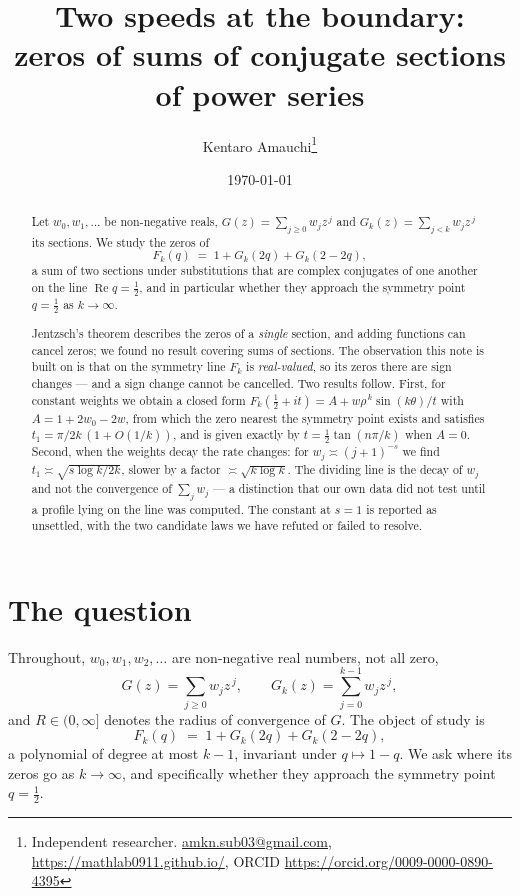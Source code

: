 \documentclass[11pt,a4paper]{article}
\title{Two speeds at the boundary:\\
zeros of sums of conjugate sections of power series}
\author{Kentaro Amauchi\thanks{Independent researcher.
\href{mailto:amkn.sub03@gmail.com}{amkn.sub03@gmail.com},
\url{https://mathlab0911.github.io/}, ORCID \url{https://orcid.org/0009-0000-0890-4395}}}
\date{\today}
\theoremstyle{plain}
\theoremstyle{definition}
\theoremstyle{remark}
\begin{document}
\maketitle

\begin{abstract}
Let $w_0,w_1,\dots$ be non-negative reals, $G(z)=\sum_{j\ge0}w_jz^{\,j}$ and
$G_k(z)=\sum_{j<k}w_jz^{\,j}$ its sections. We study the zeros of
\[
  F_k(q)\;=\;1+G_k(2q)+G_k(2-2q),
\]
a sum of two sections under substitutions that are complex conjugates of one another on
the line $\operatorname{Re}q=\tfrac12$, and in particular whether they approach the
symmetry point $q=\tfrac12$ as $k\to\infty$.

Jentzsch's theorem describes the zeros of a \emph{single} section, and adding functions
can cancel zeros; we found no result covering sums of sections. The observation this note
is built on is that on the symmetry line $F_k$ is \emph{real-valued}, so its zeros there
are sign changes --- and a sign change cannot be cancelled. Two results follow. First,
for constant weights we obtain a closed form
$F_k(\tfrac12+it)=A+w\rho^{\,k}\sin(k\theta)/t$ with $A=1+2w_0-2w$, from which the zero
nearest the symmetry point exists and satisfies $t_1=\pi/2k\,(1+O(1/k))$, and is given
exactly by $t=\tfrac12\tan(n\pi/k)$ when $A=0$. Second, when the weights decay the rate
changes: for $w_j\asymp(j+1)^{-s}$ we find $t_1\asymp\sqrt{s\log k/2k}$, slower by a
factor $\asymp\sqrt{k\log k}$. The dividing line is the decay of $w_j$ and not the
convergence of $\sum_jw_j$ --- a distinction that our own data did not test until a
profile lying on the line was computed. The constant at $s=1$ is reported as unsettled,
with the two candidate laws we have refuted or failed to resolve.
\end{abstract}

\section{The question}\label{sec:question}

Throughout, $w_0,w_1,w_2,\dots$ are non-negative real numbers, not all zero,
\[
  G(z)=\sum_{j\ge0}w_j z^{\,j},\qquad
  G_k(z)=\sum_{j=0}^{k-1}w_j z^{\,j},
\]
and $R\in(0,\infty]$ denotes the radius of convergence of $G$. The object of study is
\begin{equation}\label{eq:F}
  F_k(q)\;=\;1+G_k(2q)+G_k(2-2q),
\end{equation}
a polynomial of degree at most $k-1$, invariant under $q\mapsto1-q$. We ask where its
zeros go as $k\to\infty$, and specifically whether they approach the symmetry point
$q=\tfrac12$.
\end{document}
